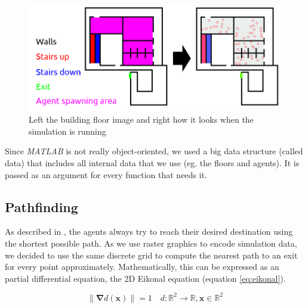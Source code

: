 \documentclass[11pt]{article}
\begin{document}
\begin{figure}[h]
\centering
\includegraphics[width=\textwidth]{./images/config_floor_description.png}
\caption{Left the building floor image and right how it looks when the
simulation is running} 
\label{building floor image}
\end{figure}

Since \textit{MATLAB} is not really object-oriented, we used a big data structure (called
data) that includes all internal data that we use (eg. the floors and agents).
It is passed as an argument for every function that needs it.

\subsection{Pathfinding}
As described in \cite{SFMPD}, the agents always try to reach their desired destination using the shortest possible path. As we use raster graphics to encode simulation data, we decided to use the same discrete grid to compute the nearest path to an exit for every point approximately.
Mathematically, this can be expressed as an partial differential equation, the 2D Eikonal equation (equation \ref{eq:eikonal}).

\begin{equation} \label{eq:eikonal}
\|\mathbf{\nabla} d(\mathbf{x})\|=1 \quad d:\!\mathbb{R}^{2}\to\mathbb{R},\mathbf{x}\in\mathbb{R}^{2}
\end{equation}
\end{document}

